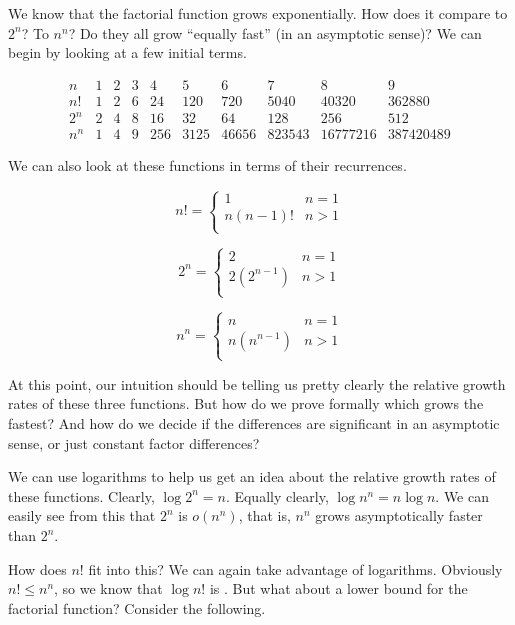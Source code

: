 \begin{example}
We know that the factorial function grows exponentially.
How does it compare to \(2^n\)? To \(n^n\)?
Do they all grow ``equally fast'' (in an asymptotic sense)?
We can begin by looking at a few initial terms.

{\small
\[\begin{array}{r|rrrrrrrrr}
n&1&2&3&4&5&6&7&8&9\\
\hline
n! &1&2&6&24&120&720&5040&40320&362880\\
2^n&2&4&8&16&32&64&128&256&512\\
n^n&1&4&9&256&3125&46656&823543&16777216&387420489
\end{array}\]
}

We can also look at these functions in terms of their recurrences.

\[n! = \left\{
\begin{array}{ll}
1&n=1\\
n(n-1)!&n>1\\
\end{array}
\right. \]

\[2^n = \left\{
\begin{array}{ll}
2&n=1\\
2(2^{n-1})&n>1\\
\end{array}
\right. \]

\[n^n = \left\{
\begin{array}{ll}
n&n=1\\
n(n^{n-1})&n>1\\
\end{array}
\right. \]

At this point, our intuition should be telling us pretty clearly the
relative growth rates of these three functions.
But how do we prove formally which grows the fastest?
And how do we decide if the differences are significant in an
asymptotic sense, or just constant factor differences?

We can use logarithms to help us get an idea about the relative growth
rates of these functions.
Clearly, \(\log 2^n = n\).
Equally clearly, \(\log n^n = n \log n\).
We can easily see from this that \(2^n\) is \(o(n^n)\), that is,
\(n^n\) grows asymptotically faster than \(2^n\).

How does \(n!\) fit into this?
We can again take advantage of logarithms.
Obviously \(n! \leq n^n\), so we know that \(\log n!\) is \Onlogn.
But what about a lower bound for the factorial function?
Consider the following.


\end{example}
